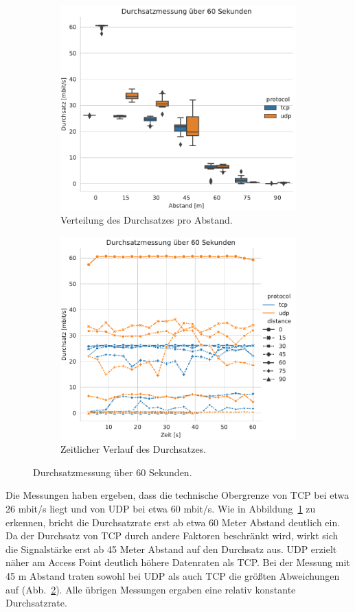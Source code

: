 \documentclass[a4paper]{article}
\begin{document}
\begin{figure}[ht]
  \begin{subfigure}{.5\textwidth}
    \centering
    \includegraphics[width=.9\linewidth]{../images/box.pdf} 
    \caption{Verteilung des Durchsatzes pro Abstand.}
    \label{fig:box}
  \end{subfigure}
  \begin{subfigure}{.5\textwidth}
    \centering
    \includegraphics[width=.9\linewidth]{../images/line.pdf} 
    \caption{Zeitlicher Verlauf des Durchsatzes.}
    \label{fig:line}
  \end{subfigure}
  \caption{Durchsatzmessung über 60 Sekunden.}
  \label{fig:performance}
\end{figure} 

  Die Messungen haben ergeben, dass die technische Obergrenze von TCP bei etwa 26 mbit/s liegt und von UDP bei etwa 60 mbit/s. 
  Wie in Abbildung~\ref{fig:box} zu erkennen, bricht die Durchsatzrate erst ab etwa 60 Meter Abstand deutlich ein. 
  Da der Durchsatz von TCP durch andere Faktoren beschränkt wird, wirkt sich die Signalstärke erst ab 45 Meter Abstand auf den Durchsatz aus. 
  UDP erzielt näher am Access Point deutlich höhere Datenraten als TCP. 
  Bei der Messung mit 45 m Abstand traten sowohl bei UDP als auch TCP die größten Abweichungen auf (Abb.~\ref{fig:line}).
  Alle übrigen Messungen ergaben eine relativ konstante Durchsatzrate.  
\end{document}
